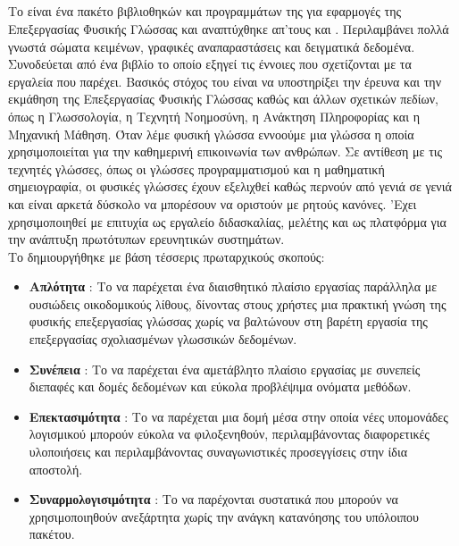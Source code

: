 {{\subsection{}
Το {} \cite{Nl02} είναι ένα πακέτο βιβλιοθηκών και προγραμμάτων της {} 
για εφαρμογές της Επεξεργασίας Φυσικής Γλώσσας και αναπτύχθηκε απ’τους
{} και {}.
Περιλαμβάνει πολλά γνωστά σώματα κειμένων, γραφικές αναπαραστάσεις
και δειγματικά δεδομένα. Συνοδεύεται από ένα βιβλίο το οποίο εξηγεί τις
έννοιες που σχετίζονται με τα εργαλεία που παρέχει. 
Βασικός στόχος του {} είναι να υποστηρίξει την έρευνα και την εκμάθηση της Επεξεργασίας
Φυσικής Γλώσσας καθώς και άλλων σχετικών πεδίων, όπως η Γλωσσολογία,
η Τεχνητή Νοημοσύνη, η Ανάκτηση Πληροφορίας και η Μηχανική Μάθηση. 
Όταν λέμε φυσική γλώσσα εννοούμε μια γλώσσα η οποία χρησιμοποιείται για την καθημερινή
επικοινωνία των ανθρώπων. Σε αντίθεση με τις τεχνητές γλώσσες, όπως οι γλώσσες προγραμματισμού
και η μαθηματική σημειογραφία, οι φυσικές γλώσσες έχουν εξελιχθεί καθώς
περνούν από γενιά σε γενιά και είναι αρκετά δύσκολο να μπορέσουν να
οριστούν με ρητούς κανόνες. 
'Εχει χρησιμοποιηθεί με επιτυχία ως εργαλείο διδασκαλίας, μελέτης και ως
πλατφόρμα για την ανάπτυξη πρωτότυπων ερευνητικών συστημάτων. \\

Το {} δημιουργήθηκε με βάση τέσσερις πρωταρχικούς σκοπούς:
\begin{itemize}
 \item \textbf{Απλότητα {}}: Το να παρέχεται ένα διαισθητικό πλαίσιο εργασίας παράλληλα με ουσιώδεις
οικοδομικούς λίθους, δίνοντας στους χρήστες μια πρακτική γνώση της φυσικής επεξεργασίας γλώσσας 
χωρίς να βαλτώνουν στη βαρέτη εργασία της επεξεργασίας σχολιασμένων γλωσσικών δεδομένων.
 \item \textbf{Συνέπεια {}}: Το να παρέχεται ένα αμετάβλητο πλαίσιο εργασίας με συνεπείς διεπαφές και
δομές δεδομένων και εύκολα προβλέψιμα ονόματα μεθόδων.
 \item \textbf{Επεκτασιμότητα {}}: Το να παρέχεται μια δομή μέσα στην οποία νέες υπομονάδες λογισμικού
μπορούν εύκολα να φιλοξενηθούν, περιλαμβάνοντας διαφορετικές υλοποιήσεις 
και περιλαμβάνοντας συναγωνιστικές προσεγγίσεις στην ίδια αποστολή.
 \item \textbf{Συναρμολογισιμότητα {}}: Το να παρέχονται συστατικά που μπορούν να χρησιμοποιηθούν ανεξάρτητα
χωρίς την ανάγκη κατανόησης του υπόλοιπου πακέτου.\newline
\end{itemize}

}}
